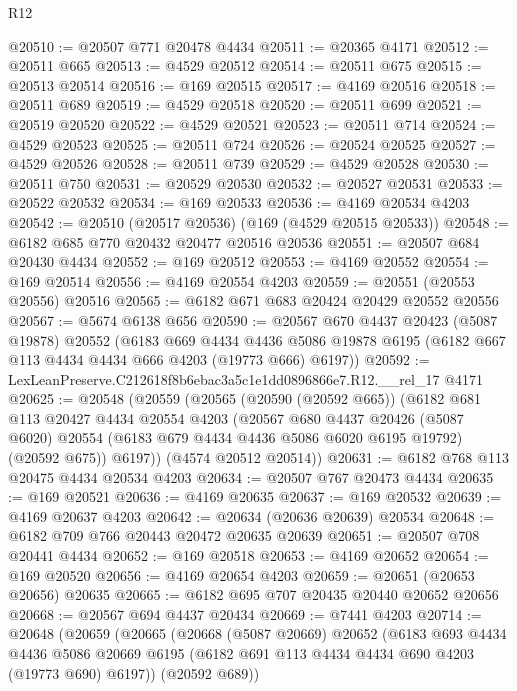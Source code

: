\begin{lexlean}{R12}
\begin{coremodule}
@20510 := @20507 @771 @20478 @4434
@20511 := @20365 @4171
@20512 := @20511 @665
@20513 := @4529 @20512
@20514 := @20511 @675
@20515 := @20513 @20514
@20516 := @169 @20515
@20517 := @4169 @20516
@20518 := @20511 @689
@20519 := @4529 @20518
@20520 := @20511 @699
@20521 := @20519 @20520
@20522 := @4529 @20521
@20523 := @20511 @714
@20524 := @4529 @20523
@20525 := @20511 @724
@20526 := @20524 @20525
@20527 := @4529 @20526
@20528 := @20511 @739
@20529 := @4529 @20528
@20530 := @20511 @750
@20531 := @20529 @20530
@20532 := @20527 @20531
@20533 := @20522 @20532
@20534 := @169 @20533
@20536 := @4169 @20534 @4203
@20542 := @20510 (@20517 @20536) (@169 (@4529 @20515 @20533))
@20548 := @6182 @685 @770 @20432 @20477 @20516 @20536
@20551 := @20507 @684 @20430 @4434
@20552 := @169 @20512
@20553 := @4169 @20552
@20554 := @169 @20514
@20556 := @4169 @20554 @4203
@20559 := @20551 (@20553 @20556) @20516
@20565 := @6182 @671 @683 @20424 @20429 @20552 @20556
@20567 := @5674 @6138 @656
@20590 := @20567
    @670
    @4437
    @20423
    (@5087 @19878)
    @20552
    (@6183
      @669
      @4434
      @4436
      @5086
      @19878
      @6195
      (@6182 @667 @113 @4434 @4434 @666 @4203 (@19773 @666) @6197))
@20592 := LexLeanPreserve.C212618f8b6ebac3a5c1e1dd0896866e7.R12.__rel_17 @4171
@20625 := @20548
    (@20559
      (@20565
        (@20590 (@20592 @665))
        (@6182
          @681
          @113
          @20427
          @4434
          @20554
          @4203
          (@20567
            @680
            @4437
            @20426
            (@5087 @6020)
            @20554
            (@6183 @679 @4434 @4436 @5086 @6020 @6195 @19792)
            (@20592 @675))
          @6197))
      (@4574 @20512 @20514))
@20631 := @6182 @768 @113 @20475 @4434 @20534 @4203
@20634 := @20507 @767 @20473 @4434
@20635 := @169 @20521
@20636 := @4169 @20635
@20637 := @169 @20532
@20639 := @4169 @20637 @4203
@20642 := @20634 (@20636 @20639) @20534
@20648 := @6182 @709 @766 @20443 @20472 @20635 @20639
@20651 := @20507 @708 @20441 @4434
@20652 := @169 @20518
@20653 := @4169 @20652
@20654 := @169 @20520
@20656 := @4169 @20654 @4203
@20659 := @20651 (@20653 @20656) @20635
@20665 := @6182 @695 @707 @20435 @20440 @20652 @20656
@20668 := @20567 @694 @4437 @20434
@20669 := @7441 @4203
@20714 := @20648
    (@20659
      (@20665
        (@20668
          (@5087 @20669)
          @20652
          (@6183
            @693
            @4434
            @4436
            @5086
            @20669
            @6195
            (@6182 @691 @113 @4434 @4434 @690 @4203 (@19773 @690) @6197))
          (@20592 @689))

\end{coremodule}
\end{lexlean}
